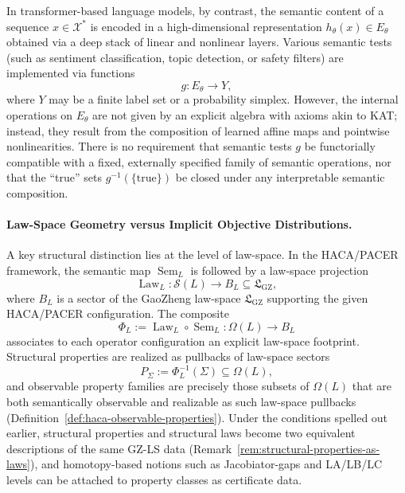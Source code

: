 \documentclass[11pt]{book}
\theoremstyle{plain}
\theoremstyle{definition}
\theoremstyle{remark}
\newcommand{\GZLS}{\ensuremath{\mathfrak{L}_{\mathrm{GZ}}}}       \newcommand{\GZLT}{\ensuremath{M_{!w}}}                           \newcommand{\GZLOC}{\ensuremath{A_M}}                             \newcommand{\GZLC}{\ensuremath{\omega_{\mathrm{law}}}}            \newcommand{\GZLCurv}{\ensuremath{\mathcal{F}_{\mathrm{law}}}}
\begin{document}
In transformer-based language models, by contrast, the semantic content
of a sequence $x\in\mathcal{X}^\ast$ is encoded in a high-dimensional
representation $h_\theta(x)\in E_\theta$ obtained via a deep stack of
linear and nonlinear layers. Various semantic tests (such as sentiment
classification, topic detection, or safety filters) are implemented via
functions
\[
  g:E_\theta \to Y,
\]
where $Y$ may be a finite label set or a probability simplex. However,
the internal operations on $E_\theta$ are not given by an explicit
algebra with axioms akin to KAT; instead, they result from the
composition of learned affine maps and pointwise nonlinearities. There is
no requirement that semantic tests $g$ be functorially compatible with a
fixed, externally specified family of semantic operations, nor that the
``true'' sets $g^{-1}(\{\mathrm{true}\})$ be closed under any
interpretable semantic composition.



\paragraph{Law-Space Geometry versus Implicit Objective Distributions.}

A key structural distinction lies at the level of law-space. In the
HACA/PACER framework, the semantic map $\operatorname{Sem}_L$ is
followed by a law-space projection
\[
  \operatorname{Law}_L:\mathcal{S}(L)\longrightarrow B_L\subseteq\GZLS,
\]
where $B_L$ is a sector of the GaoZheng law-space $\GZLS$ supporting the
given HACA/PACER configuration. The composite
\[
  \Phi_L:=\operatorname{Law}_L\circ\operatorname{Sem}_L
  :\Omega(L)\to B_L
\]
associates to each operator configuration an explicit law-space footprint.
Structural properties are realized as pullbacks of law-space sectors
\[
  P_\Sigma
  :=
  \Phi_L^{-1}(\Sigma)\subseteq\Omega(L),
\]
and observable property families are precisely those subsets of
$\Omega(L)$ that are both semantically observable and realizable as such
law-space pullbacks (Definition~\ref{def:haca-observable-properties}).
Under the conditions spelled out earlier, structural properties and
structural laws become two equivalent descriptions of the same GZ-LS data
(Remark~\ref{rem:structural-properties-as-laws}), and homotopy-based
notions such as Jacobiator-gaps and LA/LB/LC levels can be attached to
property classes as certificate data.
\end{document}
